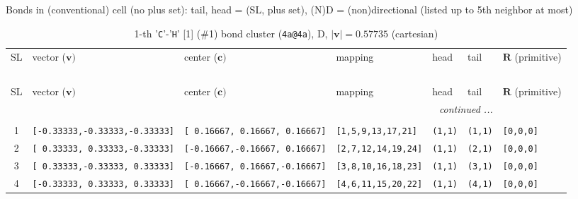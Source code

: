 \documentclass[fleqn,10pt,landscape]{jsarticle}
\begin{document}
\noindent Bonds in (conventional) cell (no plus set): tail, head = (SL, plus set), (N)D = (non)directional (listed up to 5th neighbor at most)

\renewcommand{\arraystretch}{1.6}
\begin{longtable}[l]{cllllll}
\captionsetup{justification=raggedright, singlelinecheck=off}
\caption{1-th '\texttt{C}'-'\texttt{H}' [1] (\#1) bond cluster (\texttt{4a@4a}), D, $|\bm{v}|=0.57735$ (cartesian)}
 \\
 \hline \hline
SL & vector ($\bm{v})$ & center ($\bm{c})$ & mapping & head & tail & $\bm{R}$ (primitive) \\ \hline \endfirsthead

\multicolumn{6}{l}{\tablename\ \thetable{}} \\
 \hline \hline
SL & vector ($\bm{v})$ & center ($\bm{c})$ & mapping & head & tail & $\bm{R}$ (primitive) \\ \hline \endhead

 \hline \hline
\multicolumn{6}{r}{\footnotesize\it continued ...} \\ \endfoot

 \hline \hline
\multicolumn{6}{r}{} \\ \endlastfoot

1 & \texttt{[-0.33333,-0.33333,-0.33333]} & \texttt{[ 0.16667, 0.16667, 0.16667]} & \texttt{[1,5,9,13,17,21]} & \texttt{(1,1)} & \texttt{(1,1)} & \texttt{[0,0,0]} \\ \hline
2 & \texttt{[ 0.33333, 0.33333,-0.33333]} & \texttt{[-0.16667,-0.16667, 0.16667]} & \texttt{[2,7,12,14,19,24]} & \texttt{(1,1)} & \texttt{(2,1)} & \texttt{[0,0,0]} \\ \hline
3 & \texttt{[ 0.33333,-0.33333, 0.33333]} & \texttt{[-0.16667, 0.16667,-0.16667]} & \texttt{[3,8,10,16,18,23]} & \texttt{(1,1)} & \texttt{(3,1)} & \texttt{[0,0,0]} \\ \hline
4 & \texttt{[-0.33333, 0.33333, 0.33333]} & \texttt{[ 0.16667,-0.16667,-0.16667]} & \texttt{[4,6,11,15,20,22]} & \texttt{(1,1)} & \texttt{(4,1)} & \texttt{[0,0,0]} \\
\end{longtable}
\end{document}
